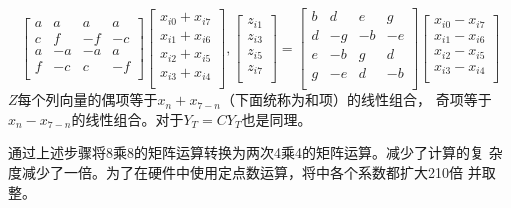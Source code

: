 \documentclass{article}
\numberwithin {equation}{section}
\begin{document}
\begin{spacing}{1.25}
\begin{equation}
\begin{bmatrix}
          a & a   & a   & a\\
          c & f   & -f  & -c\\
          a & -a  & -a  & a\\
          f & -c  & c   & -f\\
        \end{bmatrix}\begin{bmatrix}
          x_{i0}+x_{i7}\\
          x_{i1}+x_{i6}\\
          x_{i2}+x_{i5}\\
          x_{i3}+x_{i4}\\
        \end{bmatrix}, 
        \begin{bmatrix}
          z_{i1}\\z_{i3}\\z_{i5}\\z_{i7}\\
        \end{bmatrix}=\begin{bmatrix}
          b & d   & e   & g\\
          d & -g  & -b  & -e\\
          e & -b  & g   & d\\
          g & -e  & d   & -b\\
        \end{bmatrix}\begin{bmatrix}
          x_{i0}-x_{i7}\\
          x_{i1}-x_{i6}\\
          x_{i2}-x_{i5}\\
          x_{i3}-x_{i4}\\
        \end{bmatrix}
      \end{equation}
      $Z$每个列向量的偶项等于$x_{n}+x_{7-n}$（下面统称为和项）的线性组合，
      奇项等于$x_{n}-x_{7-n}$的线性组合。对于$Y_{T}=CY_{T}$也是同理。

      通过上述步骤将8乘8的矩阵运算转换为两次4乘4的矩阵运算。减少了计算的复
      杂度减少了一倍。为了在硬件中使用定点数运算，将中各个系数都扩大210倍
      并取整。


\end{spacing}
\end{document}
